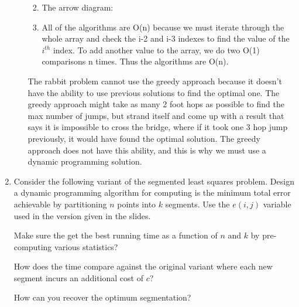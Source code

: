 \documentclass[11pt]{article}
\begin{document}
\begin{enumerate}
\begin{enumerate}
\begin{enumerate}
\vspace*{3cm}

\item
The arrow diagram:

\vspace*{3cm}

\item
All of the algorithms are O(n) because we must iterate through the whole array and check the i-2 and i-3 indexes to find the value of the $i^{th}$ index. To add another value to the array, we do two O(1) comparisons n times. Thus the algorithms are O(n).
\end{enumerate}

The rabbit problem cannot use the greedy approach because it doesn't have the ability to use previous solutions to find the optimal one. The greedy approach might take as many 2 foot hops as possible to find the max number of jumps, but strand itself and come up with a result that says it is impossible to cross the bridge, where if it took one 3 hop jump previously, it would have found the optimal solution. The greedy approach does not have this ability, and this is why we must use a dynamic programming solution.

\end{enumerate}
\item
Consider the following variant of the segmented least
squares problem. Design a dynamic programming algorithm for
computing is the minimum total error achievable
by partitioning $n$ points into $k$ segments.
Use the $e(i,j)$ variable used in the version given in the
slides.

Make sure the get the best running time as a function
of $n$ and $k$ by pre-computing various statistics? 

How does the time compare against
the original variant where each new segment incurs an
additional cost of $c$? 

How can you recover the optimum segmentation?


\end{enumerate}
\end{document}
